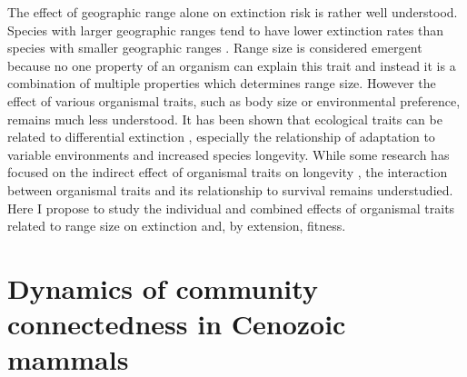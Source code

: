 \documentclass[12pt,letterpaper]{article}
\begin{document}


The effect of geographic range alone on extinction risk is rather well understood. Species with larger geographic ranges tend to have lower extinction rates than species with smaller geographic ranges \citep{Jablonski1986,Harnik2013,Nurnberg2013a,Jablonski2003,Roy2009c}. Range size is considered emergent because no one property of an organism can explain this trait and instead it is a combination of multiple properties which determines range size. However the effect of various organismal traits, such as body size or environmental preference, remains much less understood. It has been shown that ecological traits can be related to differential extinction \citep{Foote2013,Liow2007b,Baumiller1993,Nurnberg2013a}, especially the relationship of adaptation to variable environments and increased species longevity. While some research has focused on the indirect effect of organismal traits on longevity \citep{Harnik2011}, the interaction between organismal traits and its relationship to survival remains understudied. Here I propose to study the individual and combined effects of organismal traits related to range size on extinction and, by extension, fitness. 


\section{Dynamics of community connectedness in Cenozoic mammals}
\end{document}
